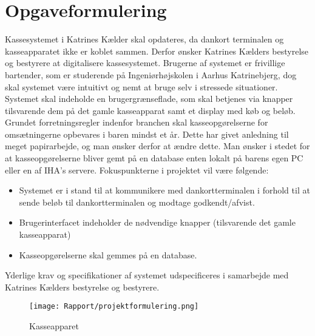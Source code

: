 \chapter{Opgaveformulering}
Kassesystemet i Katrines Kælder skal opdateres, da dankort terminalen og kasseapparatet ikke er koblet sammen. Derfor ønsker Katrines Kælders bestyrelse og bestyrere at digitalisere kassesystemet.
\newline\newline
Brugerne af systemet er frivillige bartender, som er studerende på Ingeniørhøjskolen i Aarhus Katrinebjerg, dog skal systemet være intuitivt og nemt at bruge selv i stressede situationer.
\newline\newline
Systemet skal indeholde en brugergrænseflade, som skal betjenes via knapper tilsvarende dem på det gamle kasseapparat samt et display med køb og beløb. 
\newline\newline
Grundet forretningsregler indenfor branchen skal kasseopgørelserne for omsætningerne opbevares i baren mindst et år. Dette har givet anledning til meget papirarbejde, og man ønsker derfor at ændre dette. Man ønsker i stedet for at kasseopgørelserne bliver gemt på en database enten lokalt på barens egen PC
eller en af \gls{IHA}’s servere.
\newline\newline
Fokuspunkterne i projektet vil være følgende:
\begin{itemize}
\item Systemet er i stand til at kommunikere med dankortterminalen i forhold til at sende beløb til
dankortterminalen og modtage godkendt/afvist.
\item Brugerinterfacet indeholder de nødvendige knapper (tilsvarende det gamle kasseapparat)
\item Kasseopgørelserne skal gemmes på en database.
\newline
\end{itemize}
Yderlige krav og specifikationer af systemet udspecificeres i samarbejde med Katrines Kælders bestyrelse
og bestyrere.

\begin{figure}[h]
    \centering
    \texttt{[image: Rapport/projektformulering.png]}
    \caption{Kasseapparet}
    \label{fig:kasseapparat}
\end{figure}